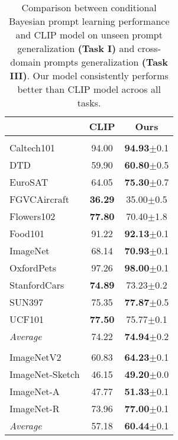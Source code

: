 \documentclass[10pt,twocolumn,letterpaper]{article}
\begin{document}
\begin{table}[t]
\centering
\renewcommand\thetable{11}
\caption{Comparison between conditional Bayesian prompt learning performance and CLIP model on unseen prompt generalization \textbf{(Task I)} and cross-domain prompts generalization \textbf{(Task III)}. Our model consistently performs better than CLIP model acroos all tasks.}
\vspace{-2mm}
\begin{tabular}{lcc}
\midrule
 & 
\multicolumn{1}{c}{\centering \textbf{CLIP}} & \multicolumn{1}{c}{\centering \textbf{Ours}} \\
\midrule
\rowcolor{palegray}
\multicolumn{3}{c}{\centering \textbf{Task I}} \\
\midrule
Caltech101              & 94.00 & \textbf{94.93}\scriptsize{$\pm$0.1}  \\
DTD                     & 59.90 & \textbf{60.80}\scriptsize{$\pm$0.5}  \\
EuroSAT                 & 64.05 & \textbf{75.30}\scriptsize{$\pm$0.7}  \\
FGVCAircraft            & \textbf{36.29} & 35.00\scriptsize{$\pm$0.5}  \\
Flowers102              & \textbf{77.80} & 70.40\scriptsize{$\pm$1.8}  \\
Food101                 & 91.22 & \textbf{92.13}\scriptsize{$\pm$0.1}  \\
ImageNet                & 68.14 & \textbf{70.93}\scriptsize{$\pm$0.1}  \\
OxfordPets              & 97.26 & \textbf{98.00}\scriptsize{$\pm$0.1}  \\
StanfordCars            & \textbf{74.89} & 73.23\scriptsize{$\pm$0.2}  \\
SUN397                  & 75.35 & \textbf{77.87}\scriptsize{$\pm$0.5}  \\
UCF101                  & \textbf{77.50} & 75.77\scriptsize{$\pm$0.1}  \\
\midrule
\textit{Average }       & 74.22 & \textbf{74.94}\scriptsize{$\pm$0.2}  \\
\midrule
\midrule
\rowcolor{palegray}
\multicolumn{3}{c}{\centering \textbf{Task III}} \\
\midrule
ImageNetV2              & 60.83 & \textbf{64.23}\scriptsize{$\pm$0.1}  \\
ImageNet-Sketch         & 46.15 & \textbf{49.20}\scriptsize{$\pm$0.0}  \\
ImageNet-A              & 47.77 & \textbf{51.33}\scriptsize{$\pm$0.1}  \\
ImageNet-R              & 73.96 & \textbf{77.00}\scriptsize{$\pm$0.1}  \\
\midrule
\textit{Average }       & 57.18 & \textbf{60.44}\scriptsize{$\pm$0.1}  \\
\bottomrule
\end{tabular}

\label{tab:fixed-prompt}
\end{table}
\end{document}
